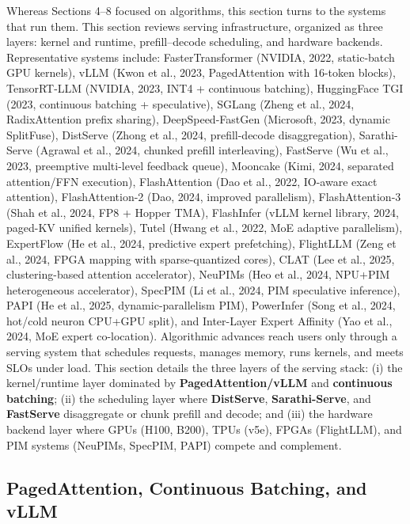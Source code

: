 Whereas Sections 4--8 focused on algorithms, this section turns to the systems that run them. This section reviews serving infrastructure, organized as three layers: kernel and runtime, prefill--decode scheduling, and hardware backends. Representative systems include: FasterTransformer (NVIDIA, 2022, static-batch GPU kernels), vLLM (Kwon et al., 2023, PagedAttention with 16-token blocks), TensorRT-LLM (NVIDIA, 2023, INT4 + continuous batching), HuggingFace TGI (2023, continuous batching + speculative), SGLang (Zheng et al., 2024, RadixAttention prefix sharing), DeepSpeed-FastGen (Microsoft, 2023, dynamic SplitFuse), DistServe (Zhong et al., 2024, prefill-decode disaggregation), Sarathi-Serve (Agrawal et al., 2024, chunked prefill interleaving), FastServe (Wu et al., 2023, preemptive multi-level feedback queue), Mooncake (Kimi, 2024, separated attention/FFN execution), FlashAttention (Dao et al., 2022, IO-aware exact attention), FlashAttention-2 (Dao, 2024, improved parallelism), FlashAttention-3 (Shah et al., 2024, FP8 + Hopper TMA), FlashInfer (vLLM kernel library, 2024, paged-KV unified kernels), Tutel (Hwang et al., 2022, MoE adaptive parallelism), ExpertFlow (He et al., 2024, predictive expert prefetching), FlightLLM (Zeng et al., 2024, FPGA mapping with sparse-quantized cores), CLAT (Lee et al., 2025, clustering-based attention accelerator), NeuPIMs (Heo et al., 2024, NPU+PIM heterogeneous accelerator), SpecPIM (Li et al., 2024, PIM speculative inference), PAPI (He et al., 2025, dynamic-parallelism PIM), PowerInfer (Song et al., 2024, hot/cold neuron CPU+GPU split), and Inter-Layer Expert Affinity (Yao et al., 2024, MoE expert co-location). Algorithmic advances reach users only through a serving system that schedules requests, manages memory, runs kernels, and meets SLOs under load. This section details the three layers of the serving stack: (i) the kernel/runtime layer dominated by \textbf{PagedAttention/vLLM} and \textbf{continuous batching}; (ii) the scheduling layer where \textbf{DistServe}, \textbf{Sarathi-Serve}, and \textbf{FastServe} disaggregate or chunk prefill and decode; and (iii) the hardware backend layer where GPUs (H100, B200), TPUs (v5e), FPGAs (FlightLLM), and PIM systems (NeuPIMs, SpecPIM, PAPI) compete and complement.

\subsection{PagedAttention, Continuous Batching, and vLLM}\label{pagedattention-continuous-batching-and-vllm}


